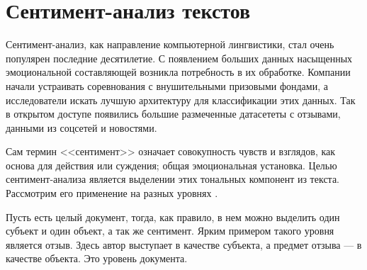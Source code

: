 \section{Сентимент\nobreak-анализ текстов}

%
%
%

\par
Сентимент-анализ, как направление компьютерной лингвистики, стал очень популярен последние десятилетие. С появлением больших данных насыщенных эмоциональной составляющей возникла потребность в их обработке. Компании начали устраивать соревнования с внушительными призовыми фондами, а исследователи искать лучшую архитектуру для классификации этих данных. Так в открытом доступе появились большие размеченные датасететы с отзывами, данными из соцсетей и новостями.

\bigskip\par
Сам термин <<сентимент>> означает совокупность чувств и взглядов, как основа для действия или суждения; общая
эмоциональная установка. Целью сентимент-анализа является выделении этих тональных компонент из текста.
Рассмотрим его применение на разных уровнях \cite{Semina}.

\bigskip\par
Пусть есть целый документ, тогда, как правило, в нем можно выделить один субъект и один объект, а так же
сентимент. Ярким примером такого уровня является отзыв. Здесь автор выступает в качестве субъекта, а предмет
отзыва --- в качестве объекта. Это уровень документа.


